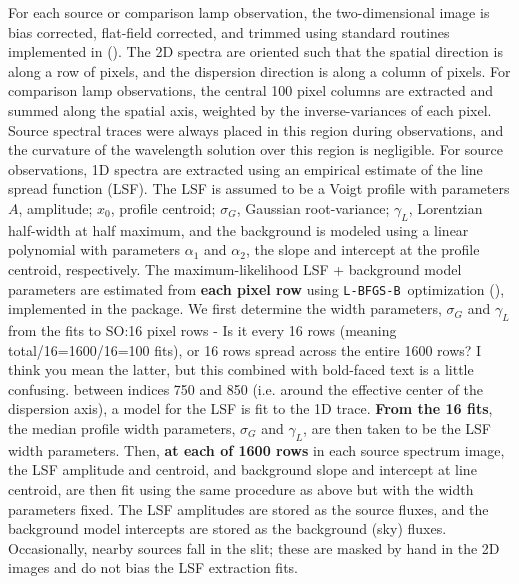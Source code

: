 \documentclass[modern, letterpaper]{aastex61}
\newcommand{\lbfgsb}{\texttt{L-BFGS-B}}
\newcommand{\smoh}[1]{\textcolor{mediumpersianblue}{SO:#1}}
\begin{document}
For each source or comparison lamp observation, the two-dimensional image is
bias corrected, flat-field corrected, and trimmed using standard routines
implemented in  (\citealt{Craig:2015}).
The 2D spectra are oriented such that the spatial direction is along a row of
pixels, and the dispersion direction is along a column of pixels.
For comparison lamp observations, the central 100 pixel columns are extracted
and summed along the spatial axis, weighted by the inverse-variances of each
pixel.
Source spectral traces were always placed in this region during observations,
and the curvature of the wavelength solution over this region is negligible.
For source observations, 1D spectra are extracted using an empirical
estimate of the line spread function (LSF).
The LSF is assumed to be a Voigt profile with parameters $A$, amplitude; $x_0$,
profile centroid; $\sigma_G$, Gaussian root-variance; $\gamma_L$, Lorentzian
half-width at half maximum, and the background is modeled using a linear
polynomial with parameters $\alpha_1$ and $\alpha_2$, the slope and intercept
at the profile centroid, respectively.
The maximum-likelihood LSF + background model parameters are estimated from
{\bf each pixel row} using \lbfgsb\ optimization (\citealt{Zhu:1994}), implemented in
the  package.
We first determine the width parameters, $\sigma_G$ and $\gamma_L$
from the fits to
\smoh{16 pixel rows - Is it every 16 rows (meaning total/16=1600/16=100 fits),
  or 16 rows spread across the entire 1600 rows? I think you mean the latter,
  but this combined with bold-faced text is a little confusing. }
between indices 750 and 850 (i.e. around the effective center of the
dispersion axis), a model for the LSF is fit to the 1D trace.
{\bf From the 16 fits}, the median profile width parameters, $\sigma_G$ and
$\gamma_L$, are then taken to be the LSF width parameters.
Then, {\bf at each of 1600 rows} in each source spectrum image, the LSF amplitude and
centroid, and background slope and intercept at line centroid, are then fit
using the same procedure as above but with the width parameters fixed.
The LSF amplitudes are stored as the source fluxes, and the background model
intercepts are stored as the background (sky) fluxes.
Occasionally, nearby sources fall in the slit; these are masked by hand in the
2D images and do not bias the LSF extraction fits.
\end{document}
